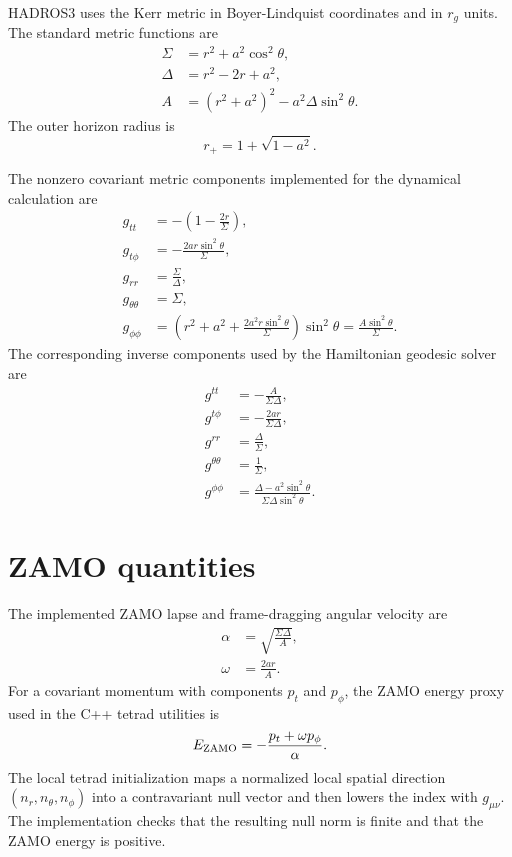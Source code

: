 \documentclass[11pt,a4paper]{report}
\numberwithin{equation}{chapter}
\newcommand{\rg}{r_g}
\begin{document}
HADROS3 uses the Kerr metric in Boyer-Lindquist coordinates and in $\rg$
units. The standard metric functions are
\begin{align}
\Sigma &= r^2 + a^2\cos^2\theta,\\
\Delta &= r^2 - 2r + a^2,\\
A &= (r^2+a^2)^2 - a^2\Delta\sin^2\theta.
\end{align}
The outer horizon radius is
\begin{equation}
r_+ = 1 + \sqrt{1-a^2}.
\end{equation}

The nonzero covariant metric components implemented for the dynamical
calculation are
\begin{align}
g_{tt} &= -\left(1-\frac{2r}{\Sigma}\right),\\
g_{t\phi} &= -\frac{2ar\sin^2\theta}{\Sigma},\\
g_{rr} &= \frac{\Sigma}{\Delta},\\
g_{\theta\theta} &= \Sigma,\\
g_{\phi\phi} &=
\left(r^2+a^2+\frac{2a^2r\sin^2\theta}{\Sigma}\right)\sin^2\theta
= \frac{A\sin^2\theta}{\Sigma}.
\end{align}
The corresponding inverse components used by the Hamiltonian geodesic solver
are
\begin{align}
g^{tt} &= -\frac{A}{\Sigma\Delta},\\
g^{t\phi} &= -\frac{2ar}{\Sigma\Delta},\\
g^{rr} &= \frac{\Delta}{\Sigma},\\
g^{\theta\theta} &= \frac{1}{\Sigma},\\
g^{\phi\phi} &=
\frac{\Delta-a^2\sin^2\theta}{\Sigma\Delta\sin^2\theta}.
\end{align}

\section{ZAMO quantities}

The implemented ZAMO lapse and frame-dragging angular velocity are
\begin{align}
\alpha &= \sqrt{\frac{\Sigma\Delta}{A}},\\
\omega &= \frac{2ar}{A}.
\end{align}
For a covariant momentum with components $p_t$ and $p_\phi$, the ZAMO energy
proxy used in the C++ tetrad utilities is
\begin{equation}
E_{\rm ZAMO}= -\frac{p_t+\omega p_\phi}{\alpha}.
\end{equation}
The local tetrad initialization maps a normalized local spatial direction
$(n_r,n_\theta,n_\phi)$ into a contravariant null vector and then lowers the
index with $g_{\mu\nu}$. The implementation checks that the resulting null norm
is finite and that the ZAMO energy is positive.
\end{document}
